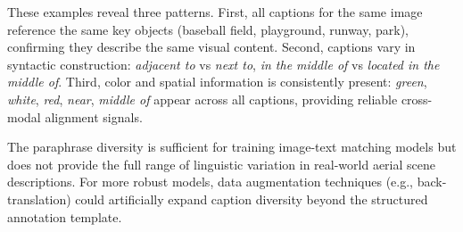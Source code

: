 These examples reveal three patterns. First, all captions for the same image reference the same key objects (baseball field, playground, runway, park), confirming they describe the same visual content. Second, captions vary in syntactic construction: \textit{adjacent to} vs \textit{next to}, \textit{in the middle of} vs \textit{located in the middle of}. Third, color and spatial information is consistently present: \textit{green}, \textit{white}, \textit{red}, \textit{near}, \textit{middle of} appear across all captions, providing reliable cross-modal alignment signals.

The paraphrase diversity is sufficient for training image-text matching models but does not provide the full range of linguistic variation in real-world aerial scene descriptions. For more robust models, data augmentation techniques (e.g., back-translation) could artificially expand caption diversity beyond the structured annotation template.

